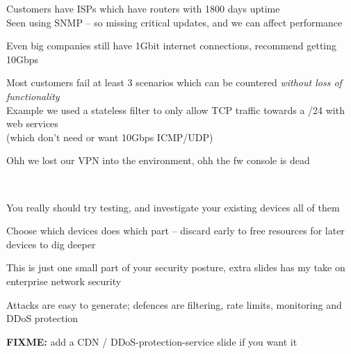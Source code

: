 \documentclass[Screen16to9,17pt]{foils}
\begin{document}
\begin{list2}
\item Customers have ISPs which have routers with 1800 days uptime\\
Seen using SNMP -- so missing critical updates, and we can affect performance
\item Even big companies still have 1Gbit internet connections, recommend getting 10Gbps
\item Most customers fail at least 3 scenarios which can be countered \emph{without loss of functionality}\\
Example we used a stateless filter to only allow TCP traffic towards a /24 with web services\\
(which don't need or want 10Gbps ICMP/UDP)

\item Ohh we lost our VPN into the environment, ohh the fw console is dead
\end{list2}


~
\begin{list2}
\item You really should try testing, and investigate your existing devices
all of them
\item Choose which devices does which part -- discard early to free resources for later devices to dig deeper
\item This is just one small part of your security posture, extra slides has my take on enterprise network security
\end{list2}

\myquestionspage

\begin{list2}
\item Attacks are easy to generate; defences are filtering, rate limits, monitoring and DDoS protection
\item \textbf{FIXME:} add a CDN / DDoS-protection-service slide if you want it
\end{list2}
\end{document}
